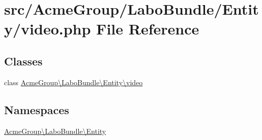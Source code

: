 \hypertarget{video_8php}{\section{src/\+Acme\+Group/\+Labo\+Bundle/\+Entity/video.php File Reference}
\label{video_8php}
}
\subsection*{Classes}
\begin{DoxyCompactItemize}
\item 
class \hyperlink{class_acme_group_1_1_labo_bundle_1_1_entity_1_1video}{Acme\+Group\textbackslash{}\+Labo\+Bundle\textbackslash{}\+Entity\textbackslash{}video}
\end{DoxyCompactItemize}
\subsection*{Namespaces}
\begin{DoxyCompactItemize}
\item 
 \hyperlink{namespace_acme_group_1_1_labo_bundle_1_1_entity}{Acme\+Group\textbackslash{}\+Labo\+Bundle\textbackslash{}\+Entity}
\end{DoxyCompactItemize}
